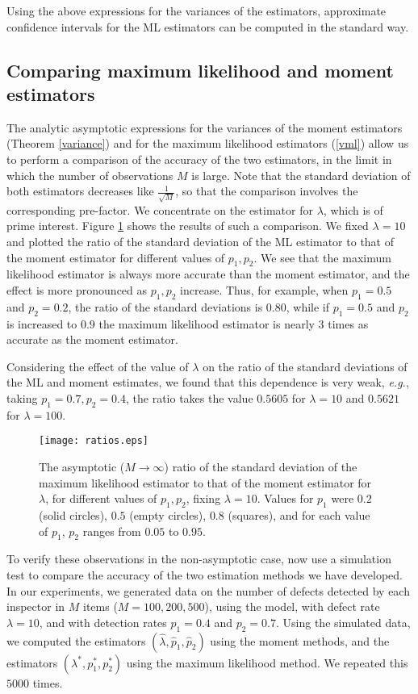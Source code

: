\documentclass[a4paper,10pt,twoside]{article}
\begin{document}
Using the above expressions for the variances of the estimators, approximate confidence intervals for the ML estimators can
be computed in the standard way.


\subsection{Comparing maximum likelihood and moment estimators}

The analytic asymptotic expressions for the variances of the moment estimators (Theorem \ref{variance}) and 
for the maximum likelihood estimators (\ref{vml}) allow us to perform a comparison of the accuracy of the two estimators,
in the limit in which the number of observations $M$ is large. Note that the standard deviation of both estimators decreases 
like $\frac{1}{\sqrt{M}}$, so that the comparison involves the corresponding pre-factor. We concentrate on the 
estimator for $\lambda$, which is of prime interest.  Figure \ref{compp} shows the 
results of such a comparison.  We fixed $\lambda=10$ and plotted the ratio of the standard deviation of the 
ML estimator to that of the moment estimator for different values of $p_1,p_2$. We see that the maximum
likelihood estimator is always more accurate than the moment estimator, and the effect is more pronounced as $p_1,p_2$ increase.
Thus, for example, when $p_1=0.5$ and $p_2=0.2$, the ratio of the standard deviations is $0.80$, while if $p_1=0.5$ and $p_2$ is
increased to $0.9$ the maximum likelihood estimator is nearly $3$ times as accurate as the moment estimator. 

Considering the effect of the value of $\lambda$ on the ratio of the standard deviations of the ML and moment estimates,
we found that this dependence is very weak, {\it{e.g.}}, taking $p_1=0.7,p_2=0.4$,
the ratio takes the value $0.5605$ for $\lambda=10$ and $0.5621$ for $\lambda=100$.

\begin{figure}
	\centering
	\texttt{[image: ratios.eps]}	
	\caption{The asymptotic ($M\rightarrow \infty$) ratio of the standard deviation of the maximum likelihood estimator to that of the moment estimator for $\lambda$, for different values of $p_1,p_2$, fixing $\lambda=10$. Values for $p_1$ were 
	$0.2$ (solid circles), $0.5$ (empty circles), $0.8$ (squares), and for each value of $p_1$, $p_2$ ranges from $0.05$ to $0.95$.}
	\label{compp}
\end{figure}

To verify these observations in the non-asymptotic case, now use a simulation test to compare the accuracy of the two estimation methods we have developed. 
In our experiments, we generated data on the number of defects detected by each inspector in $M$ items ($M=100,200,500$), using the model, with defect rate $\lambda=10$, and with detection rates $p_1=0.4$ and $p_2=0.7$. Using the simulated data, we computed the estimators $(\hat{\lambda},\hat{p}_1,\hat{p}_2)$ using the moment methods, and the estimators $(\lambda^*,p_1^*,p_2^*)$ using the
maximum likelihood method. We repeated this $5000$ times.
\end{document}
